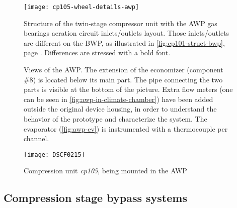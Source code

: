 \begin{figure}[htbp]
  \centering
  \texttt{[image: cp105-wheel-details-awp]}
  \caption[Structure of the twin-stage compressor unit with the AWP
  gas bearings aeration circuit I/O layout]{Structure of the
    twin-stage compressor unit with the AWP gas bearings aeration
    circuit inlets/outlets layout. Those inlets/outlets are different
    on the BWP, as illustrated in \cref{fig:cp101-struct-bwp}, page
    \pageref{fig:cp101-struct-bwp}.  Differences are stressed with a
    bold font.}
  \label{fig:cp105-struct-awp}
\end{figure}

\begin{figure}[htbp]
  \centering
  \hspace{1em}
  \caption[Views of the AWP]{Views of the AWP. The extension of the
    economizer (component \#8) is located below its main part. The
    pipe connecting the two parts is visible at the bottom of the
    picture. Extra flow meters (one can be seen in
    \cref{fig:awp-in-climate-chamber}) have been added outside the
    original device housing, in order to understand the behavior of
    the prototype and characterize the system. The evaporator
    (\cref{fig:awp-ev}) is instrumented with a thermocouple per
    channel.}
  \label{fig:awp-views-in-climate-chamber}
\end{figure}

\begin{figure}[htbp]
  \centering
  \texttt{[image: DSCF0215]}
  \caption{Compression unit \textit{cp105}, being mounted in the AWP}
  \label{fig:cp105-being-mounted-in-awp}
\end{figure}


\subsection{Compression stage bypass systems}
\label{sec:awp-bypass}

